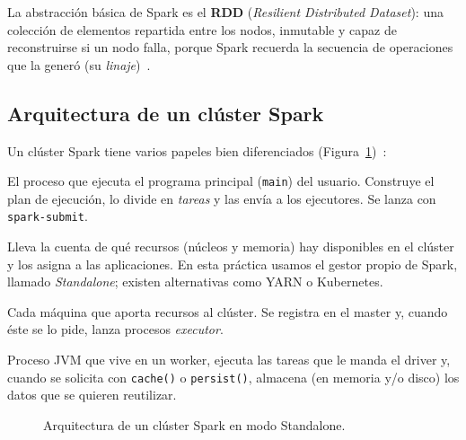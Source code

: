 \documentclass[11pt,a4paper]{article}
\begin{document}
La abstracción básica de Spark es el \textbf{RDD} (\emph{Resilient Distributed Dataset}): una colección de elementos repartida entre los nodos, inmutable y capaz de reconstruirse si un nodo falla, porque Spark recuerda la secuencia de operaciones que la generó (su \emph{linaje})~\cite{spark-rdd-guide}.

\subsection{Arquitectura de un clúster Spark}

Un clúster Spark tiene varios papeles bien diferenciados (Figura~\ref{fig:arquitectura})~\cite{spark-cluster-overview}:

\begin{description}[style=nextline]
  \item[Driver] El proceso que ejecuta el programa principal (\texttt{main}) del usuario. Construye el plan de ejecución, lo divide en \emph{tareas} y las envía a los ejecutores. Se lanza con \texttt{spark-submit}.
  \item[Cluster Manager (Master)] Lleva la cuenta de qué recursos (núcleos y memoria) hay disponibles en el clúster y los asigna a las aplicaciones. En esta práctica usamos el gestor propio de Spark, llamado \emph{Standalone}; existen alternativas como YARN o Kubernetes.
  \item[Worker] Cada máquina que aporta recursos al clúster. Se registra en el master y, cuando éste se lo pide, lanza procesos \emph{executor}.
  \item[Executor] Proceso JVM que vive en un worker, ejecuta las tareas que le manda el driver y, cuando se solicita con \texttt{cache()} o \texttt{persist()}, almacena (en memoria y/o disco) los datos que se quieren reutilizar.
\end{description}

\begin{figure}[htbp]
\centering
{}
\caption{Arquitectura de un clúster Spark en modo Standalone.}
\label{fig:arquitectura}
\end{figure}
\end{document}
